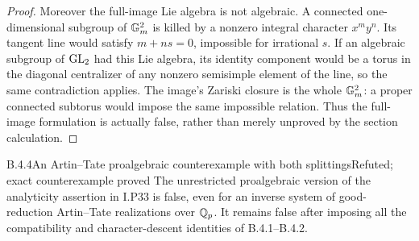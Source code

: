 \begin{proof}
Moreover the full-image Lie algebra is not algebraic. A
connected one-dimensional subgroup of $\mathbb G_m^2$ is killed by
a nonzero integral character $x^my^n$. Its tangent line
would satisfy $m+ns=0$, impossible for irrational $s$.
If an algebraic subgroup of $\operatorname{GL}_2$ had this Lie algebra,
its identity component would be a torus in the diagonal
centralizer of any nonzero semisimple element of the line,
so the same contradiction applies. The image's Zariski
closure is the whole $\mathbb G_m^2$: a proper connected subtorus
would impose the same impossible relation. Thus the
full-image formulation is actually false, rather than merely
unproved by the section calculation.
\end{proof}

\begin{result}{B.4.4}{An Artin--Tate proalgebraic counterexample with both splittings}{Refuted; exact counterexample proved}
The unrestricted proalgebraic version of the analyticity
assertion in I.P33 is false, even for an inverse system of
good-reduction Artin--Tate realizations over $\mathbb Q_p$. It remains
false after imposing all the compatibility and character-descent
identities of B.4.1--B.4.2.
\end{result}
